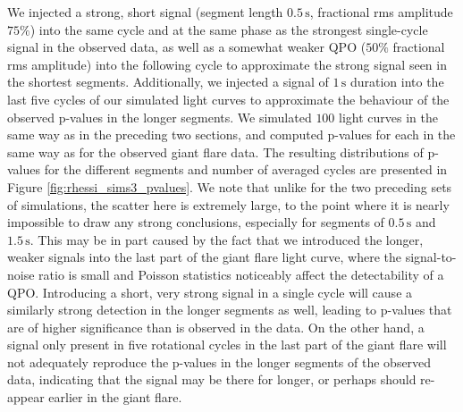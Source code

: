 \documentclass{emulateapj}
\begin{document}
We injected a strong, short signal (segment length $0.5\,\mathrm{s}$, fractional rms amplitude $75\%$) into the same cycle and at the same phase as the strongest single-cycle signal in the observed data, as well as a somewhat weaker QPO ($50\%$ fractional rms amplitude) into the following cycle to approximate the strong signal seen in the shortest segments. Additionally, we injected a signal of $1\,\mathrm{s}$ duration into the last five cycles of our simulated light curves to approximate the behaviour of the observed p-values in the longer segments. We simulated $100$ light curves in the same way as in the preceding two sections, and computed p-values for each in the same way as for the observed giant flare data. The resulting distributions of p-values for the different segments and number of averaged cycles are presented in Figure \ref{fig:rhessi_sims3_pvalues}. We note that unlike for the two preceding sets of simulations, the scatter here is extremely large, to the point where it is nearly impossible to draw any strong conclusions, especially for segments of $0.5\, \mathrm{s}$ and $1.5 \, \mathrm{s}$. This may be in part caused by the fact that we introduced the longer, weaker signals into the last part of the giant flare light curve, where the signal-to-noise ratio is small and Poisson statistics noticeably affect the detectability of a QPO.
Introducing a short, very strong signal in a single cycle will cause a similarly strong detection in the longer segments as well, leading to p-values that are of higher significance than is observed in the data. On the other hand, a signal only present in five rotational cycles in the last part of the giant flare will not adequately reproduce the p-values in the longer segments of the observed data, indicating that the signal may be there for longer, or perhaps should re-appear earlier in the giant flare.
\end{document}
